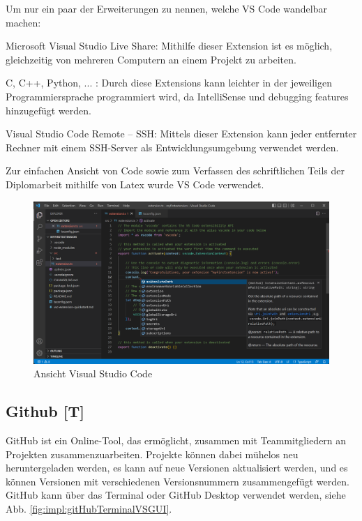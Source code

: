 Um nur ein paar der Erweiterungen zu nennen, welche VS Code wandelbar machen: 

\begin{compactitem}
    \item Microsoft Visual Studio Live Share: Mithilfe dieser Extension ist es möglich, gleichzeitig von mehreren Computern an einem Projekt zu arbeiten.
    \item C, C++, Python, ... : Durch diese Extensions kann leichter in der jeweiligen Programmiersprache programmiert wird, da IntelliSense und debugging features hinzugefügt werden.
    \item Visual Studio Code Remote – SSH: Mittels dieser Extension kann jeder entfernter Rechner mit einem SSH-Server als Entwicklungsumgebung verwendet werden.
\end{compactitem}
\cite{VSCodeOfficialSite}

Zur einfachen Ansicht von Code sowie zum Verfassen des schriftlichen Teils der Diplomarbeit mithilfe von Latex wurde VS Code verwendet.

\begin{figure}[h t]
  \centering
  \includegraphics[scale=0.48]{pics/visualStudioCode.png}
  \caption{Ansicht Visual Studio Code}
  \label{fig:impl:vsCode}
\end{figure}

\subsection{Github [T]} 
GitHub ist ein Online-Tool, das ermöglicht, zusammen mit Teammitgliedern  an Projekten zusammenzuarbeiten. Projekte können dabei mühelos neu heruntergeladen werden, es kann auf neue Versionen aktualisiert werden, und es können Versionen mit verschiedenen Versionsnummern zusammengefügt werden. GitHub kann über das Terminal oder GitHub Desktop verwendet werden, siehe Abb. \ref{fig:impl:gitHubTerminalVSGUI}.

